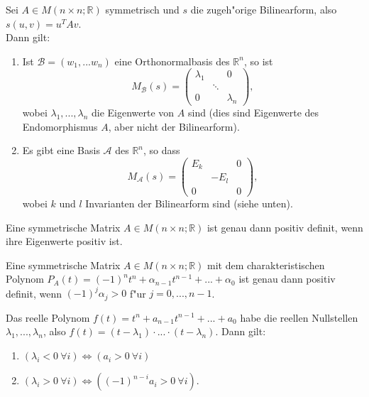 \documentclass[11pt, a4paper]{article}
\begin{document}
\begin{theorem}  Sei $A \in M(n \times n; \mathbb{R})$ symmetrisch und $s$ die zugeh"orige Bilinearform, also $s(u, v) = u^T A v$.
\\Dann gilt:
\begin{enumerate}
\item Ist $\mathcal{B} = (w_1, ... w_n)$ eine Orthonormalbasis des $\mathbb{R}^n$, so ist
$$
M_\mathcal{B}(s) = \left(\begin{array}{ccc}\lambda_{1} & & 0 
\\ & \ddots & 
\\ 0 & & \lambda_{n}\end{array}\right), 
$$
wobei $\lambda_1, ..., \lambda_n$ die Eigenwerte von $A$ sind (dies sind Eigenwerte des Endomorphismus $A$, aber nicht der Bilinearform).
\item Es gibt eine Basis $\mathcal{A}$ des $\mathbb{R}^n$, so dass
$$
M_\mathcal{A}(s) =  \left(\begin{array}{ccc}E_k & & 0 
\\ & -E_l & 
\\ 0 & & 0\end{array}\right),
$$
wobei $k$ und $l$ Invarianten der Bilinearform sind (siehe unten).
\end{enumerate}
\end{theorem}

\begin{corollary}
Eine symmetrische Matrix $A \in M(n \times n; \mathbb{R})$ ist genau dann positiv definit, wenn ihre Eigenwerte positiv ist.
\end{corollary}

\begin{corollary}
Eine symmetrische Matrix $A \in M(n \times n; \mathbb{R})$ mit dem charakteristischen Polynom $P_A(t) = (-1)^n t^n + \alpha_{n-1}t^{n-1} + ... + \alpha_0$ ist genau dann positiv definit, wenn $(-1)^j \alpha_j > 0$ f"ur $j = 0, ..., n-1$.
\end{corollary}

\begin{lemma}
Das reelle Polynom $f(t) = t^n + a_{n-1}t^{n-1} + ... +a_0$ habe die reellen Nullstellen $\lambda_1, ..., \lambda_n$, also $f(t) = (t - \lambda_1) \cdot ... \cdot (t - \lambda_n)$. Dann gilt:
\begin{enumerate}
\item $(\lambda_i < 0 \ \forall i) \Leftrightarrow (a_i > 0 \ \forall i)$
\item $(\lambda_i > 0 \ \forall i) \Leftrightarrow ( (-1)^{n-i}a_i > 0 \ \forall i)$.
\end{enumerate}

\end{lemma}
\end{document}
